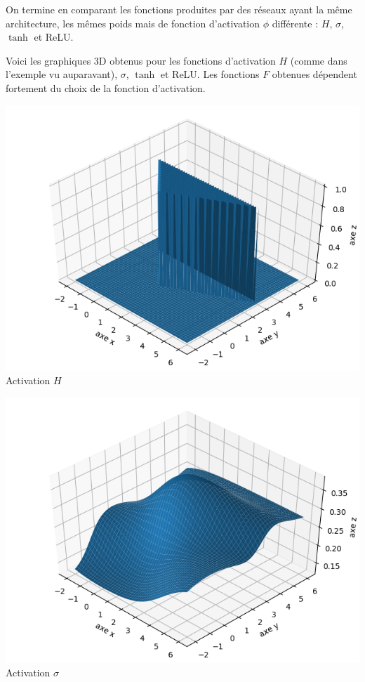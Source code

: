 \begin{exemple}{}{}
	On termine en comparant les fonctions produites par des réseaux ayant la même architecture, les mêmes poids mais de fonction d'activation $\phi$ différente : $H$, $\sigma$, $\tanh$ et ReLU.
	
	
	Voici les graphiques 3D obtenus pour les fonctions d'activation $H$ (comme dans l'exemple vu auparavant), $\sigma$, $\tanh$ et ReLU. Les fonctions $F$ obtenues dépendent fortement du choix de la fonction d'activation.
	
	\begin{center}
		\begin{minipage}{0.4\textwidth}
			\center
			\includegraphics[scale=\myscale,scale=0.4]{figures/neurones-surface-2-heaviside}
			Activation $H$
		\end{minipage}\quad
		\begin{minipage}{0.4\textwidth}
			\center
			\includegraphics[scale=\myscale,scale=0.4]{figures/neurones-surface-2-sigma}
			Activation $\sigma$
		\end{minipage}
	\end{center}
	

\end{exemple}
